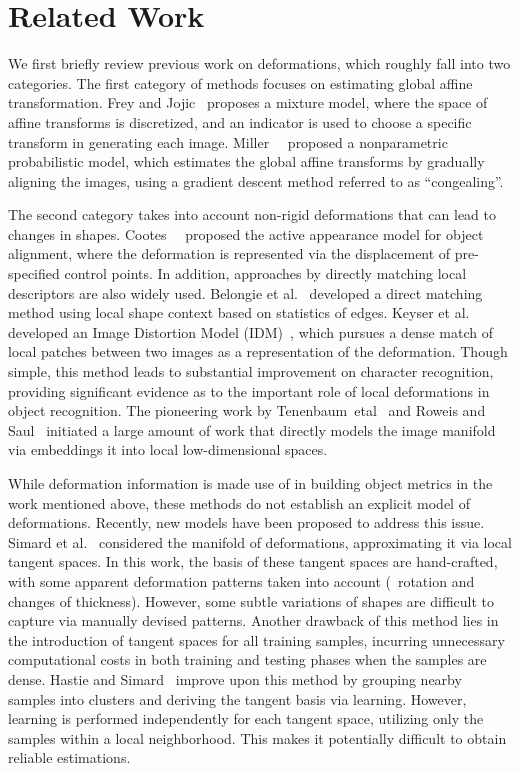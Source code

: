 \section{Related Work}
\label{sec:review}

We first briefly review previous work on deformations, which roughly
fall into two categories.
The first category of methods focuses on estimating global affine
transformation. Frey and Jojic~\cite{TMG1,TMG2,TMG3} proposes a
mixture model, where the space of affine transforms is discretized,
and an indicator is used to choose a specific transform in generating
each image.
Miller~\etal~\cite{Congeal} proposed a nonparametric probabilistic
model, which estimates the global affine transforms by gradually
aligning the images, using a gradient descent method referred to as ``congealing''.

The second category takes into account non-rigid deformations that can
lead to changes in shapes. Cootes~\etal~\cite{AAM,JP} proposed the
active appearance model for object alignment, where the deformation is
represented via the displacement of pre-specified control points.  In
addition, approaches by directly matching local descriptors are also
widely used.  Belongie et al.~\cite{SC} developed a direct matching
method using local shape context based on statistics of edges.  Keyser
et al.~\cite{IDM} developed an Image Distortion Model
(IDM)~\cite{IDM}, which pursues a dense match of local patches between
two images as a representation of the deformation.  Though simple,
this method leads to substantial improvement on character recognition,
providing significant evidence as to the important role of local
deformations in object recognition.  The pioneering work by
Tenenbaum~etal~\cite{ISO} and Roweis and Saul~\cite{LLE} initiated a
large amount of work that directly models the image manifold via
embeddings it into local low-dimensional spaces.

While deformation information is made use of in building object
metrics in the work mentioned above, these methods do not establish
an explicit model of deformations. Recently, new models have been
proposed to address this issue.
Simard et al.~\cite{TD} considered the manifold of deformations,
approximating it via local tangent spaces. In this work, the
basis of these tangent spaces are hand-crafted, with some apparent
deformation patterns taken into account (\eg~rotation and changes of
thickness). However, some subtle variations of shapes are difficult to
capture via manually devised patterns.
Another drawback of this method lies in the introduction of tangent
spaces for all training samples, incurring unnecessary
computational costs in both training and testing phases when the
samples are dense.
%
Hastie and Simard~\cite{HTrevor,ATV} improve upon this method by
grouping nearby samples into clusters and deriving the tangent basis
via learning. However, learning is performed independently for each
tangent space, utilizing only the samples within a local neighborhood.
This makes it potentially difficult to obtain reliable estimations. 







